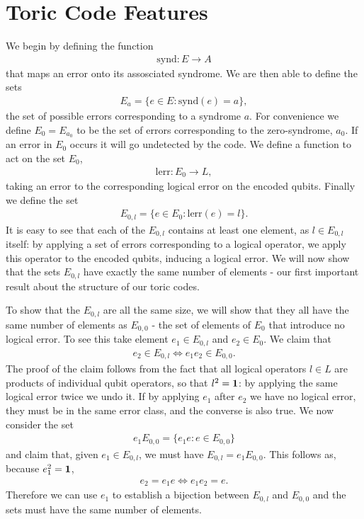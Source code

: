 \section{Toric Code Features}

We begin by defining the function
\begin{align}
  \text{synd}: E \rightarrow A
\end{align}
that maps an error onto its assosciated syndrome. We are then able to define the sets
\begin{align}
  E_a = \{ e\in E : \text{synd}(e) = a \},
\end{align}
the set of possible errors corresponding to a syndrome $a$. For convenience we define $E_0 = E_{a_0}$ to be the set of errors corresponding to the zero-syndrome, $a_0$. If an error in $E_0$ occurs it will go undetected by the code. We define a function to act on the set $E_0$,
\begin{align}
  \text{lerr}: E_0 \rightarrow L,
\end{align}
taking an error to the corresponding logical error on the encoded qubits. Finally we define the set
\begin{align}
  E_{0, l} = \{ e\in E_0: \text{lerr}(e) = l \}.
\end{align}
It is easy to see that each of the $E_{0, l}$ contains at least one element, as $l \in E_{0, l}$ itself: by applying a set of errors corresponding to a logical operator, we apply this operator to the encoded qubits, inducing a logical error.  We will now show that the sets $E_{0,l}$ have exactly the same number of elements - our first important result about the structure of our toric codes.

To show that the $E_{0, l}$ are all the same size, we will show that they all have the same number of elements as $E_{0,0}$ - the set of elements of $E_0$ that introduce no logical error. To see this take element $e_1 \in E_{0, l}$ and $e_2 \in E_0$. We claim that
\begin{align}
  e_2 \in E_{0, l} \Leftrightarrow e_1 e_2 \in E_{0,0}.
\end{align}
The proof of the claim follows from the fact that all logical operators $l\in L$ are products of individual qubit operators, so that $l^2 = \mathbf{1}$: by applying the same logical error twice we undo it. If by applying $e_1$ after $e_2$ we have no logical error, they must be in the same error class, and the converse is also true. We now consider the set
\begin{align}
  e_1 E_{0,0} = \{e_1 e : e \in E_{0,0}\}
\end{align}
and claim that, given $e_1 \in E_{0,l}$, we must have $E_{0, l} = e_1 E_{0,0}$. This follows as, because $e_1^2 = \mathbf{1}$,
\begin{align}
  e_2 =  e_1 e \Leftrightarrow e_1 e_2 = e.
\end{align}
Therefore we can use $e_1$ to establish a bijection between $E_{0,l}$ and $E_{0,0}$ and the sets must have the same number of elements.

